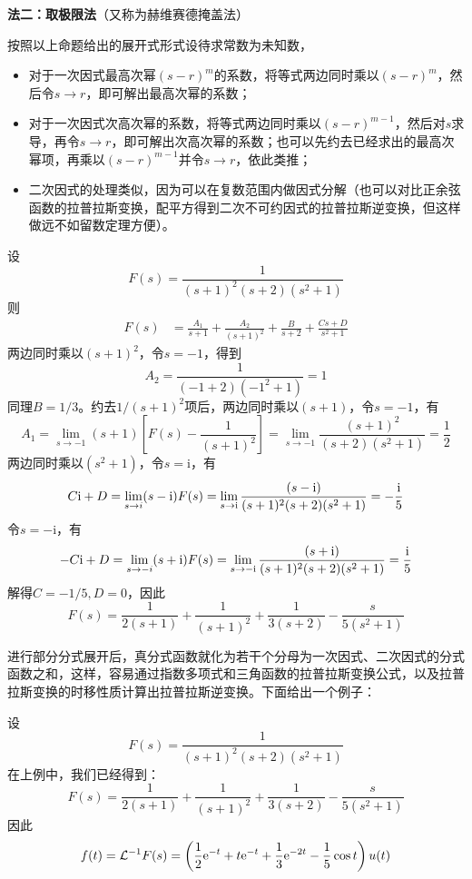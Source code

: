 \noindent \textbf{法二：取极限法}（又称为赫维赛德掩盖法）

按照以上命题给出的展开式形式设待求常数为未知数，\begin{itemize}
    \item 对于一次因式最高次幂$(s-r)^m$的系数，将等式两边同时乘以$(s-r)^m$，然后令$s\to r$，即可解出最高次幂的系数；
    \item 对于一次因式次高次幂的系数，将等式两边同时乘以$(s-r)^{m-1}$，然后对$s$求导，再令$s\to r$，即可解出次高次幂的系数；也可以先约去已经求出的最高次幂项，再乘以$(s-r)^{m-1}$并令$s\to r$，依此类推；
    \item 二次因式的处理类似，因为可以在复数范围内做因式分解（也可以对比正余弦函数的拉普拉斯变换，配平方得到二次不可约因式的拉普拉斯逆变换，但这样做远不如留数定理方便）。
\end{itemize}

\begin{example}\label{exmp:partial_fraction}
    设\[F(s)=\frac{1}{(s+1)^2(s+2)(s^2+1)}\]
    则
    \begin{align*}
        F(s)&=\frac{A_1}{s+1}+\frac{A_2}{(s+1)^2}+\frac{B}{s+2}+\frac{C s+D}{s^2+1}
    \end{align*}
    两边同时乘以$(s+1)^2$，令$s=-1$，得到
    \[A_2=\frac{1}{(-1+2)(-1^2+1)}=1\]
    同理$B=1/3$。约去$1/(s+1)^2$项后，两边同时乘以$(s+1)$，令$s=-1$，有
    \[A_1=\lim_{s\to -1}(s+1)\left[F(s)-\frac{1}{(s+1)^2}\right]=\lim_{s\to -1}\frac{(s+1)^2}{(s+2)(s^2+1)}=\frac{1}{2}\]
    两边同时乘以$(s^2+1)$，令$s=\mathrm{i}$，有
    \[C \mathrm{i}+D=\lim_{s\to i}(s-\mathrm{i})F(s)=\lim_{s\to \mathrm{i}}\frac{(s-\mathrm{i})}{(s+1)^2(s+2)(s^2+1)}=-\frac{\mathrm{i}}{5}\]
    令$s=-\mathrm{i}$，有
    \[-C \mathrm{i}+D=\lim_{s\to -i}(s+\mathrm{i})F(s)=\lim_{s\to -\mathrm{i}}\frac{(s+\mathrm{i})}{(s+1)^2(s+2)(s^2+1)}=\frac{\mathrm{i}}{5}\]
    解得$C=-1/5,D=0$，因此
    \[F(s)=\frac{1}{2(s+1)}+\frac{1}{(s+1)^2}+\frac{1}{3(s+2)}-\frac{s}{5(s^2+1)}\]
\end{example}

进行部分分式展开后，真分式函数就化为若干个分母为一次因式、二次因式的分式函数之和，这样，容易通过指数多项式和三角函数的拉普拉斯变换公式，以及拉普拉斯变换的时移性质计算出拉普拉斯逆变换。下面给出一个例子：
\begin{example}[部分分式展开法求拉普拉斯逆变换]
    设\[F(s)=\frac{1}{(s+1)^2(s+2)(s^2+1)}\]
    在上例中，我们已经得到：
    \[F(s)=\frac{1}{2(s+1)}+\frac{1}{(s+1)^2}+\frac{1}{3(s+2)}-\frac{s}{5(s^2+1)}\]
    因此
    \[f(t)=\mathcal{L}^{-1}F(s)=\left(\frac{1}{2}\mathrm{e}^{-t}+t\mathrm{e}^{-t}+\frac{1}{3}\mathrm{e}^{-2t}-\frac{1}{5}\cos t\right)u(t)\]
\end{example}

